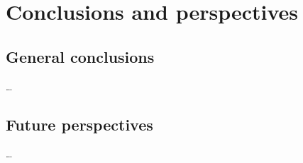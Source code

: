 \chapter{Conclusions and perspectives}\label{ch:conclusion}

\section{General conclusions}
\ldots
\section{Future perspectives}
\ldots

\instructionsconclusions


\cleardoublepage

